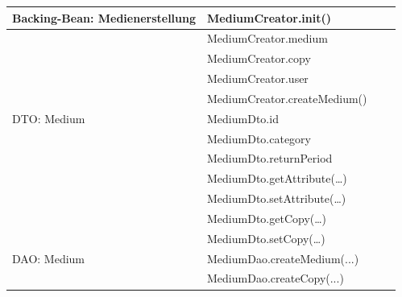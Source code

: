 \documentclass{article}
\begin{document}
\begin{longtable}{|l|l|l|l|}
\hline
Backing-Bean: Medienerstellung          & MediumCreator.init()                     &                             &                        \\ 
\hline
                                        & MediumCreator.medium                     &                             &                        \\ 
\hline
                                        & MediumCreator.copy                       &                             &                        \\ 
\hline
                                        & MediumCreator.user                       &                             &                        \\ 
\hline
                                        & MediumCreator.createMedium()             &                             &                        \\ 
\hline
DTO: Medium                             & MediumDto.id                             &                             &                        \\ 
\hline
                                        & MediumDto.category                       &                             &                        \\ 
\hline
                                        & MediumDto.returnPeriod                   &                             &                        \\ 
\hline
                                        & MediumDto.getAttribute(…)                &                             &                        \\ 
\hline
                                        & MediumDto.setAttribute(…)                &                             &                        \\ 
\hline
                                        & MediumDto.getCopy(…)                     &                             &                        \\ 
\hline
                                        & MediumDto.setCopy(…)                     &                             &                        \\ 
\hline
DAO: Medium                             & MediumDao.createMedium(...)              &                             &                        \\ 
\hline
                                        & MediumDao.createCopy(...)                &                             &                        \\ 

\end{longtable}
\end{document}
